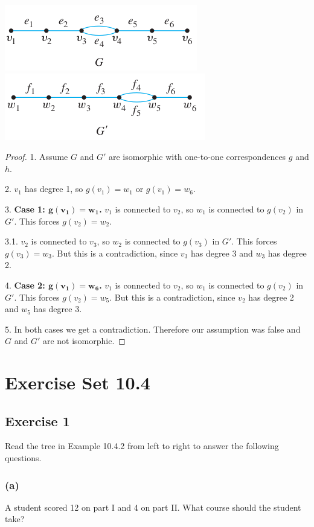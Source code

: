 \documentclass[14pt]{extarticle}
\begin{document}
\includegraphics[scale=0.7]{../images/10.3.30.1.png} \includegraphics[scale=0.7]{../images/10.3.30.2.png}

\begin{proof}
    1. Assume \(G\) and \(G'\) are isomorphic with one-to-one correspondences \(g\) and \(h\).

    2. \(v_1\) has degree 1, so \(g(v_1) = w_1\) or \(g(v_1) = w_6\).

    3. {\bf Case 1: \(\bm{g(v_1) = w_1}\).} \(v_1\) is connected to \(v_2\), so \(w_1\) is connected to \(g(v_2)\) in \(G'\).
    This forces \(g(v_2) = w_2\).

    3.1. \(v_2\) is connected to \(v_3\), so \(w_2\) is connected to \(g(v_3)\) in \(G'\). This forces \(g(v_3) = w_3\). But
    this is a contradiction, since \(v_3\) has degree 3 and \(w_3\) has degree 2.

    4. {\bf Case 2: \(\bm{g(v_1) = w_6}\).} \(v_1\) is connected to \(v_2\), so \(w_1\) is connected to \(g(v_2)\) in \(G'\).
    This forces \(g(v_2) = w_5\). But this is a contradiction, since \(v_2\) has degree 2 and \(w_5\) has degree 3.

    5. In both cases we get a contradiction. Therefore our assumption was false and \(G\) and \(G'\) are not isomorphic.
\end{proof}

\section{Exercise Set 10.4}
\subsection{Exercise 1}
Read the tree in Example 10.4.2 from left to right to answer the following questions.

\subsubsection{(a)}
A student scored 12 on part I and 4 on part II. What course should the student take?
\end{document}
